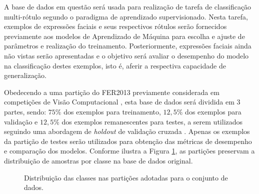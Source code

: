 A base de dados em questão será usada para realização de tarefa de classificação multi-rótulo segundo o paradigma de aprendizado supervisionado. Nesta tarefa, exemplos de expressões faciais e seus respectivos rótulos serão fornecidos previamente aos modelos de Aprendizado de Máquina para escolha e ajuste de parâmetros e realização do treinamento. Posteriormente, expressões faciais ainda não vistas serão apresentadas e o objetivo será avaliar o desempenho do modelo na classificação destes exemplos, isto é, aferir a respectiva capacidade de generalização.

Obedecendo a uma partição do FER2013 previamente considerada em competições de Visão Computacional \cite{Kaggle:FER2013}, esta base de dados será dividida em $3$ partes, sendo: $75\%$ dos exemplos para treinamento,  $12,5\%$ dos exemplos para validação e $12,5\%$ dos exemplos remanescentes para testes, a serem utilizados seguindo uma abordagem de \emph{holdout} de validação cruzada  \cite{Brink:MachineLearningLivro}.  Apenas os exemplos da partição de testes serão utilizados para obtenção das métricas de desempenho e comparação dos modelos. Conforme ilustra a Figura \ref{fig:particoes}, as partições preservam a distribuição de amostras por classe na base de dados original.

\begin{figure}[h!]
	\centering
  	\caption{Distribuição das classes nas partições adotadas para o conjunto de dados.} \label{fig:particoes}
\end{figure}


